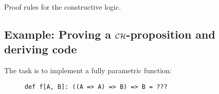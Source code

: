 \begin{table}
\begin{centering}
{\small{}}%
\par\end{centering}
\caption{Proof rules for the constructive logic.\label{tab:Proof-rules-for-constructive-logic}}
\end{table}


\subsection{Example: Proving a ${\cal CH}$-proposition and deriving code\label{subsec:Example:-Proving-a-ch-proposition}}

The task is to implement a fully parametric function:

\begin{wrapfigure}{l}{0.45\columnwidth}%
\vspace{-0.75\baselineskip}
\begin{lstlisting}
def f[A, B]: ((A => A) => B) => B = ???
\end{lstlisting}

\vspace{-0.9\baselineskip}
\end{wrapfigure}%

